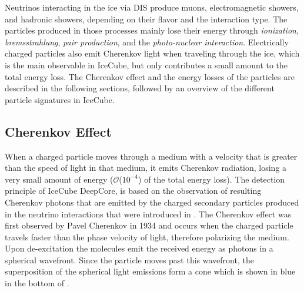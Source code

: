 Neutrinos interacting in the ice via DIS produce muons, electromagnetic showers, and hadronic showers, depending on their flavor and the interaction type. The particles produced in those processes mainly lose their energy through \textit{ionization}, \textit{bremsstrahlung}, \textit{pair production}, and the \textit{photo-nuclear interaction}. Electrically charged particles also emit Cherenkov light when traveling through the ice, which is the main observable in IceCube, but only contributes a small amount to the total energy loss. The Cherenkov effect and the energy losses of the particles are described in the following sections, followed by an overview of the different particle signatures in IceCube.


\subsection{Cherenkov Effect} 

When a charged particle moves through a medium with a velocity that is greater than the speed of light in that medium, it emits Cherenkov radiation, losing a very small amount of energy ($\mathcal{O}$($10^{-4}$) of the total energy loss). The detection principle of IceCube DeepCore, is based on the observation of resulting Cherenkov photons that are emitted by the charged secondary particles produced in the neutrino interactions that were introduced in . The Cherenkov effect was first observed by Pavel Cherenkov in 1934  and occurs when the charged particle travels faster than the phase velocity of light, therefore polarizing the medium. Upon de-excitation the molecules emit the received energy as photons in a spherical wavefront. Since the particle moves past this wavefront, the superposition of the spherical light emissions form a cone which is shown in blue in the bottom of .

